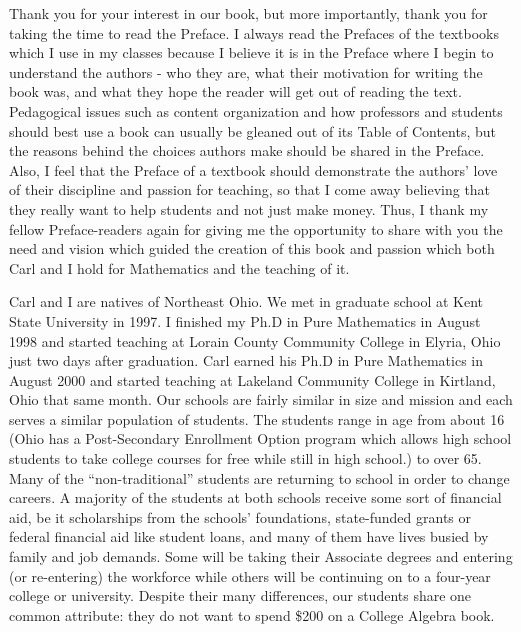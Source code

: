 \documentclass{ximera}
\begin{document}
	\author{Stitz-Zeager}


\noindent Thank you for your interest in our book, but more importantly, thank you for taking the time to read the Preface.  I always read the Prefaces of the textbooks which I use in my classes because I believe it is in the Preface where I begin to understand the authors - who they are, what their motivation for writing the book was, and what they hope the reader will get out of reading the text.  Pedagogical issues such as content organization and how professors and students should best use a book can usually be gleaned out of its Table of Contents, but the reasons behind the choices authors make should be shared in the Preface.  Also, I feel that the Preface of a textbook should demonstrate the authors' love of their discipline and passion for teaching, so that I come away believing that they really want to help students and not just make money. Thus, I thank my fellow Preface-readers again for giving me the opportunity to share with you the need and vision which guided the creation of this book and passion which both Carl and I hold for Mathematics and the teaching of it.

\medskip

\noindent Carl and I are natives of Northeast Ohio.  We met in graduate school at Kent State University in 1997.  I finished my Ph.D in Pure Mathematics in August 1998 and started teaching at Lorain County Community College in Elyria, Ohio just two days after graduation.  Carl earned his Ph.D in Pure Mathematics in August 2000 and started teaching at Lakeland Community College in Kirtland, Ohio that same month.  Our schools are fairly similar in size and mission and each serves a similar population of students.  The students range in age from about 16 (Ohio has a Post-Secondary Enrollment Option program which allows high school students to take college courses for free while still in high school.) to over 65.  Many of the ``non-traditional'' students are returning to school in order to change careers.  A majority of the students at both schools receive some sort of financial aid, be it scholarships from the schools' foundations, state-funded grants or federal financial aid like student loans, and many of them have lives busied by family and job demands.  Some will be taking their Associate degrees and entering (or re-entering) the workforce while others will be continuing on to a four-year college or university.  Despite their many differences, our students share one common attribute: they do not want to spend \$200 on a College Algebra book.
\end{document}

